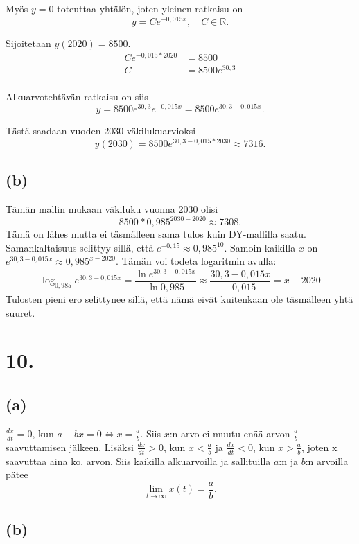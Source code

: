 \documentclass{article}
\begin{document}
Myös $y = 0$ toteuttaa yhtälön, joten yleinen ratkaisu on
\[
  y = Ce^{-0,015x}, \quad C \in \mathbb{R}.
\]

Sijoitetaan $y(2020) = 8500$.
\begin{align*}
  Ce^{-0,015 * 2020} &= 8500 \\
  C &= 8500e^{30,3} \\
\end{align*}

Alkuarvotehtävän ratkaisu on siis
\[
  y = 8500e^{30,3} e^{-0,015x}
    = 8500e^{30,3 - 0,015x}.
\]

Tästä saadaan vuoden 2030 väkilukuarvioksi
\[
  y(2030) = 8500e^{30,3 - 0,015 * 2030} \approx 7316.
\]

\subsection*{(b)}

Tämän mallin mukaan väkiluku vuonna 2030 olisi
\[
  8500 * 0,985^{2030 - 2020} \approx 7308.
\]
Tämä on lähes mutta ei täsmälleen sama tulos kuin DY-mallilla saatu.
Samankaltaisuus selittyy sillä, että $e^{-0,15} \approx 0,985^{10}$.
Samoin kaikilla $x$ on $e^{30,3 - 0,015x} \approx 0,985^{x - 2020}$.
Tämän voi todeta logaritmin avulla:
\[
  \log_{0,985} e^{30,3 - 0,015x}
    = \frac{\ln e^{30,3 - 0,015x}}{\ln 0,985}
    \approx \frac{30,3 - 0,015x}{-0,015}
    = x - 2020
\]
Tulosten pieni ero selittynee sillä, että nämä eivät kuitenkaan ole
täsmälleen yhtä suuret.

\section*{10.}

\subsection*{(a)}

$\frac{dx}{dt} = 0$, kun $a - bx = 0 \iff x = \frac{a}{b}$.
Siis $x$:n arvo ei muutu enää arvon $\frac{a}{b}$ saavuttamisen
jälkeen. Lisäksi $\frac{dx}{dt} > 0$, kun $x < \frac{a}{b}$
ja $\frac{dx}{dt} < 0$, kun $x > \frac{a}{b}$, joten x saavuttaa aina
ko. arvon. Siis kaikilla alkuarvoilla ja sallituilla $a$:n ja $b$:n arvoilla
pätee
\[
  \lim_{t \to \infty} x(t) = \frac{a}{b}.
\]

\subsection*{(b)}
\end{document}
